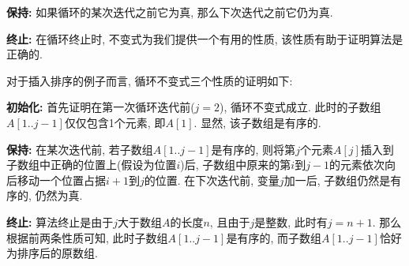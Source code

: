 \documentclass[UTF8,a4paper,zihao=-4,oneside,onecolumn,scheme=chinese,autoindent=true]{ctexbook}
\begin{document}
\textbf{保持: }如果循环的某次迭代之前它为真, 那么下次迭代之前它仍为真.

\textbf{终止: }在循环终止时, 不变式为我们提供一个有用的性质, 该性质有助于证明算法是正确的.

对于插入排序的例子而言, 循环不变式三个性质的证明如下:

\textbf{初始化: }首先证明在第一次循环迭代前($j=2$), 循环不变式成立. 此时的子数组$A[1..j-1]$仅仅包含1个元素, 即$A[1]$. 显然, 该子数组是有序的.

\textbf{保持: }在某次迭代前, 若子数组$A[1..j-1]$是有序的, 则将第$j$个元素$A[j]$插入到子数组中正确的位置上(假设为位置$i$)后, 子数组中原来的第$i$到$j-1$的元素依次向后移动一个位置占据$i+1$到$j$的位置. 在下次迭代前, 变量$j$加一后, 子数组仍然是有序的, 仍然为真.

\textbf{终止: }算法终止是由于$j$大于数组$A$的长度$n$, 且由于$j$是整数, 此时有$j=n+1$. 那么根据前两条性质可知, 此时子数组$A[1..j-1]$是有序的, 而子数组$A[1..j-1]$恰好为排序后的原数组.
\end{document}
